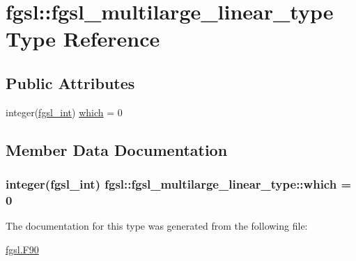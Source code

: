 \hypertarget{structfgsl_1_1fgsl__multilarge__linear__type}{}\section{fgsl\+:\+:fgsl\+\_\+multilarge\+\_\+linear\+\_\+type Type Reference}
\label{structfgsl_1_1fgsl__multilarge__linear__type}
\subsection*{Public Attributes}
\begin{DoxyCompactItemize}
\item 
integer(\hyperlink{namespacefgsl_a222deda1d7a0c0e845ce4a683318efeb}{fgsl\+\_\+int}) \hyperlink{structfgsl_1_1fgsl__multilarge__linear__type_a4dfcfcb1602db2fe452f2c329820d841}{which} = 0
\end{DoxyCompactItemize}


\subsection{Member Data Documentation}
\hypertarget{structfgsl_1_1fgsl__multilarge__linear__type_a4dfcfcb1602db2fe452f2c329820d841}{}
\subsubsection[{which}]{\setlength{\rightskip}{0pt plus 5cm}integer({\bf fgsl\+\_\+int}) fgsl\+::fgsl\+\_\+multilarge\+\_\+linear\+\_\+type\+::which = 0}\label{structfgsl_1_1fgsl__multilarge__linear__type_a4dfcfcb1602db2fe452f2c329820d841}


The documentation for this type was generated from the following file\+:\begin{DoxyCompactItemize}
\item 
\hyperlink{fgsl_8F90}{fgsl.\+F90}\end{DoxyCompactItemize}

